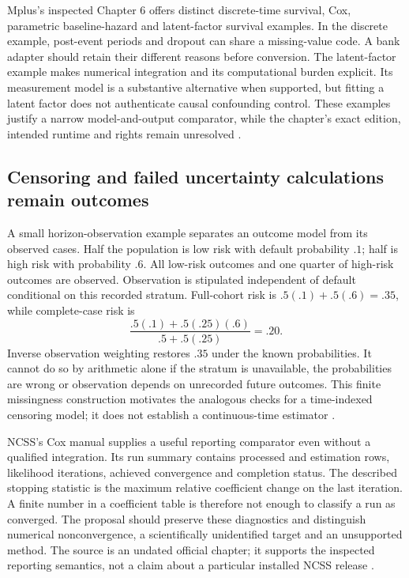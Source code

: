 Mplus's inspected Chapter 6 offers distinct discrete-time survival, Cox,
parametric baseline-hazard and latent-factor survival examples. In the
discrete example, post-event periods and dropout can share a missing-value
code. A bank adapter should retain their different reasons before conversion.
The latent-factor example makes numerical integration and its computational
burden explicit. Its measurement model is a substantive alternative when
supported, but fitting a latent factor does not authenticate causal confounding
control. These examples justify a narrow model-and-output comparator, while
the chapter's exact edition, intended runtime and rights remain unresolved
\citep{exec14_survival_mplus}.

\subsection{Censoring and failed uncertainty calculations remain outcomes}

A small horizon-observation example separates an outcome model from its
observed cases. Half the population is low risk with default probability $.1$;
half is high risk with probability $.6$. All low-risk outcomes and one quarter
of high-risk outcomes are observed. Observation is stipulated independent
of default conditional on this recorded stratum. Full-cohort risk is
$.5(.1)+.5(.6)=.35$, while complete-case risk is
\[
 \frac{.5(.1)+.5(.25)(.6)}{.5+.5(.25)}=.20.
\]
Inverse observation weighting restores $.35$ under the known probabilities.
It cannot do so by arithmetic alone if the stratum is unavailable, the
probabilities are wrong or observation depends on unrecorded future outcomes.
This finite missingness construction motivates the analogous checks for a
time-indexed censoring model; it does not establish a continuous-time estimator
\citep{exec14_survival_exact}.

NCSS's Cox manual supplies a useful reporting comparator even without a
qualified integration. Its run summary contains processed and estimation
rows, likelihood iterations, achieved convergence and completion status.
The described stopping statistic is the maximum relative coefficient change
on the last iteration. A finite number in a coefficient table is therefore
not enough to classify a run as converged. The proposal should preserve
these diagnostics and distinguish numerical nonconvergence, a scientifically
unidentified target and an unsupported method. The source is an undated
official chapter; it supports the inspected reporting semantics, not a
claim about a particular installed NCSS release \citep{exec14_survival_ncss}.

